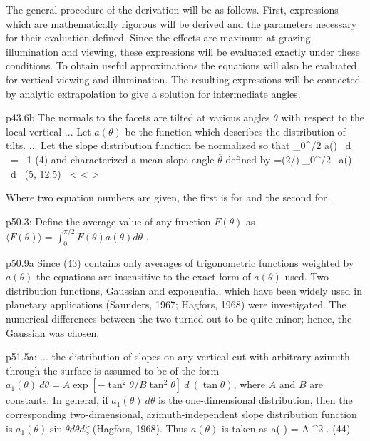\documentclass{article}
\newcommand{\eqq}{ \ < \! \! < \! > \ } %
\begin{document}
The general procedure of the derivation will be as follows. First, expressions
which are mathematically rigorous will be derived and the parameters necessary
for their evaluation defined. Since the effects are maximum at grazing
illumination and viewing, these expressions will be evaluated exactly under
these conditions. To obtain useful approximations the equations will also be
evaluated for vertical viewing and illumination. The resulting expressions will
be connected by analytic extrapolation to give a solution for intermediate
angles.  \eq

p43.6b \bq The normals to the facets are tilted at various angles $\theta$ with
respect to the local vertical ...  Let $a(\theta)$ be the function which
describes the distribution of tilts.  ...  Let the slope distribution function
be normalized so that 
\qb \int_0^{\pi/2} a(\theta) \ d \theta \ = \ 1 \qeq (4) \qe
 and characterized a mean slope angle $\overline{\theta}$  defined by 
\qb  \tan \overline{\theta} =(2/\pi) \int_0^{\pi/2} \tan \vartheta \ a(\vartheta) \ d \vartheta \ \qeq (5, 12.5) \qeq  \eqq   \qe 

Where two equation numbers are given, the first is for  and the
second for .

p50.3: \bq Define the average value of any function $ F(\theta)$ as $ \langle F(\theta) \rangle = \int _0^{\pi/2} F(\theta ) a(\theta ) d\theta $ . \eq

p50.9a \bq Since (43) contains only averages of trigonometric functions weighted
by $a(\theta)$ the equations are insensitive to the exact form of $a(\theta)$
used. Two distribution functions, Gaussian and exponential, which have been
widely used in planetary applications (Saunders, 1967; Hagfors, 1968) were
investigated. The numerical differences between the two turned out to be quite
minor; hence, the Gaussian was chosen. \eq

p51.5a:  ... the distribution of slopes on any vertical cut with arbitrary azimuth
through the surface \bq is assumed to be of the form
$ a_1(\theta ) \ d \theta  = A \exp \left[ - \tan^2 \theta /  B \tan^2 \overline{\theta} \right] \ d \ ( \tan \theta ) $, 
where $A$ and $B$ are constants. In general, if $ a_1(\theta ) \ d \theta$ is the 
one-dimensional distribution, then the corresponding two-dimensional, 
azimuth-independent slope distribution function is  
$ a_1(\theta )  \sin \theta d \theta d \zeta$  (Hagfors, 1968). 
Thus $ a(\theta )$ is taken as 
\qb a( \theta) = A \exp {} \sec^2 \theta   \sin \theta . \qeq(44) \qe
\end{document}
